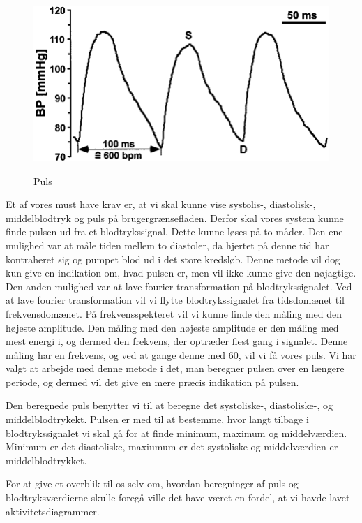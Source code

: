 \begin{figure}[h!]
	\centering
	\includegraphics[width=0.5\linewidth]{Arkitektur_og_design/Softwarearkitektur/puls}
	\label{fig:puls}
	\caption{Puls}
\end{figure}

\clearpage

Et af vores must have krav er, at vi skal kunne vise systolis-, diastolisk-, middelblodtryk og puls på brugergrænsefladen. Derfor skal vores system kunne finde pulsen ud fra et blodtrykssignal. Dette kunne løses på to måder. Den ene mulighed var at måle tiden mellem to diastoler, da hjertet på denne tid har kontraheret sig og pumpet blod ud i det store kredsløb. Denne metode vil dog kun give en indikation om, hvad pulsen er, men vil ikke kunne give den nøjagtige.
Den anden mulighed var at lave fourier transformation på blodtrykssignalet. Ved at lave fourier transformation vil vi flytte blodtrykssignalet fra tidsdomænet til frekvensdomænet. På frekvensspekteret vil vi kunne finde den måling med den højeste amplitude. Den måling med den højeste amplitude er den måling med mest energi i, og dermed den frekvens, der optræder flest gang i signalet. Denne måling har en frekvens, og ved at gange denne med 60, vil vi få vores puls. Vi har valgt at arbejde med denne metode i det, man beregner pulsen over en længere periode, og dermed vil det give en mere præcis indikation på pulsen.

Den beregnede puls benytter vi til at beregne det systoliske-, diastoliske-, og middelblodtrykekt. Pulsen er med til at bestemme, hvor langt tilbage i blodtrykssignalet vi skal gå for at finde minimum, maximum og middelværdien. Minimum er det diastoliske, maxiumum er det systoliske og middelværdien er middelblodtrykket.

For at give et overblik til os selv om, hvordan beregninger af puls og blodtryksværdierne skulle foregå ville det have været en fordel, at vi havde lavet aktivitetsdiagrammer.

